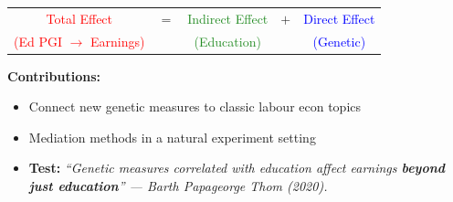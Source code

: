 \documentclass[dvipsnames,handout]{beamer} %
\begin{document}
\begin{frame}[noframenumbering]
    \begin{table}
        \centering
        \begin{tabular}{c c c c c}
            \textcolor{red}{Total Effect} & $=$ &
            \textcolor{ForestGreen}{Indirect Effect} & $+$ &
            \textcolor{blue}{Direct Effect} \\
            \textcolor{red}{(Ed PGI $\to$ Earnings)}
            && \textcolor{ForestGreen}{(Education)}
            && \textcolor{blue}{(Genetic)}
        \end{tabular}
    \end{table}
    \textbf{Contributions:}
    \begin{itemize}
        \item Connect new genetic measures to classic labour econ topics
        \item Mediation methods in a natural experiment setting
        \item \textbf{Test:} \textit{``Genetic measures correlated with education affect earnings \textbf{beyond just education}'' --- Barth Papageorge Thom (2020).}
    \end{itemize}
\end{frame}
\end{document}
